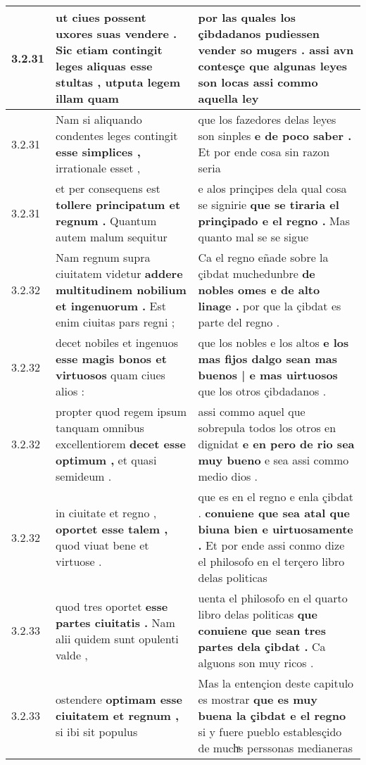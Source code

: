 \begin{tabular}{|p{1cm}|p{6.5cm}|p{6.5cm}|}
3.2.31 & ut ciues possent uxores suas vendere . \textbf{ Sic etiam contingit leges aliquas esse stultas , } utputa legem illam quam & por las quales los çibdadanos pudiessen vender so mugers . \textbf{ assi avn contesçe que algunas leyes son locas } assi commo aquella ley \\\hline
3.2.31 & Nam si aliquando condentes leges contingit \textbf{ esse simplices , } irrationale esset , & que los fazedores delas leyes son sinples \textbf{ e de poco saber . } Et por ende cosa sin razon seria \\\hline
3.2.31 & et per consequens est \textbf{ tollere principatum et regnum . } Quantum autem malum sequitur & e alos prinçipes dela qual cosa se signirie \textbf{ que se tiraria el prinçipado e el regno . } Mas quanto mal se se sigue \\\hline
3.2.32 & Nam regnum supra ciuitatem videtur \textbf{ addere multitudinem nobilium et ingenuorum . } Est enim ciuitas pars regni ; & Ca el regno eñade sobre la çibdat muchedunbre \textbf{ de nobles omes e de alto linage . } por que la çibdat es parte del regno . \\\hline
3.2.32 & decet nobiles et ingenuos \textbf{ esse magis bonos et virtuosos } quam ciues alios : & que los nobles e los altos \textbf{ e los mas fijos dalgo sean mas buenos | e mas uirtuosos } que los otros çibdadanos . \\\hline
3.2.32 & propter quod regem ipsum tanquam omnibus excellentiorem \textbf{ decet esse optimum , } et quasi semideum . & assi commo aquel que sobrepula todos los otros en dignidat \textbf{ e en pero de rio sea muy bueno } e sea assi commo medio dios . \\\hline
3.2.32 & in ciuitate et regno , \textbf{ oportet esse talem , } quod viuat bene et virtuose . & que es en el regno e enla çibdat . \textbf{ conuiene que sea atal que biuna bien e uirtuosamente . } Et por ende assi conmo dize el philosofo en el terçero libro delas politicas \\\hline
3.2.33 & quod tres oportet \textbf{ esse partes ciuitatis . } Nam alii quidem sunt opulenti valde , & uenta el philosofo en el quarto libro delas politicas \textbf{ que conuiene que sean tres partes dela çibdat . } Ca alguons son muy ricos . \\\hline
3.2.33 & ostendere \textbf{ optimam esse ciuitatem et regnum , } si ibi sit populus & Mas la entençion deste capitulo es mostrar \textbf{ que es muy buena la çibdat e el regno } si y fuere pueblo establesçido de muchͣs perssonas medianeras \\\hline

\end{tabular}
